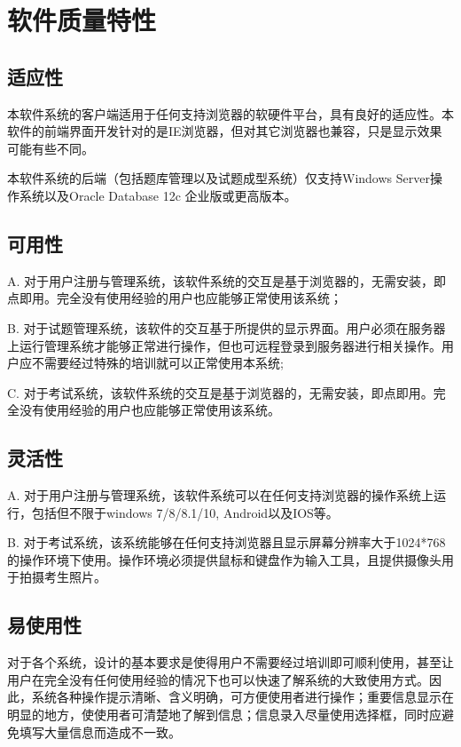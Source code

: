 \chapter{软件质量特性}

\section{适应性}

本软件系统的客户端适用于任何支持浏览器的软硬件平台，具有良好的适应性。本软件的前端界面开发针对的是IE浏览器，但对其它浏览器也兼容，只是显示效果可能有些不同。

本软件系统的后端（包括题库管理以及试题成型系统）仅支持Windows Server操作系统以及Oracle Database 12c 企业版或更高版本。

\section{可用性}
A. 对于用户注册与管理系统，该软件系统的交互是基于浏览器的，无需安装，即点即用。完全没有使用经验的用户也应能够正常使用该系统；

B. 对于试题管理系统，该软件的交互基于所提供的显示界面。用户必须在服务器上运行管理系统才能够正常进行操作，但也可远程登录到服务器进行相关操作。用户应不需要经过特殊的培训就可以正常使用本系统;

C. 对于考试系统，该软件系统的交互是基于浏览器的，无需安装，即点即用。完全没有使用经验的用户也应能够正常使用该系统。

\section{灵活性}
A. 对于用户注册与管理系统，该软件系统可以在任何支持浏览器的操作系统上运行，包括但不限于windows 7/8/8.1/10, Android以及IOS等。

B. 对于考试系统，该系统能够在任何支持浏览器且显示屏幕分辨率大于1024*768的操作环境下使用。操作环境必须提供鼠标和键盘作为输入工具，且提供摄像头用于拍摄考生照片。

\section{易使用性}
对于各个系统，设计的基本要求是使得用户不需要经过培训即可顺利使用，甚至让用户在完全没有任何使用经验的情况下也可以快速了解系统的大致使用方式。因此，系统各种操作提示清晰、含义明确，可方便使用者进行操作；重要信息显示在明显的地方，使使用者可清楚地了解到信息；信息录入尽量使用选择框，同时应避免填写大量信息而造成不一致。

